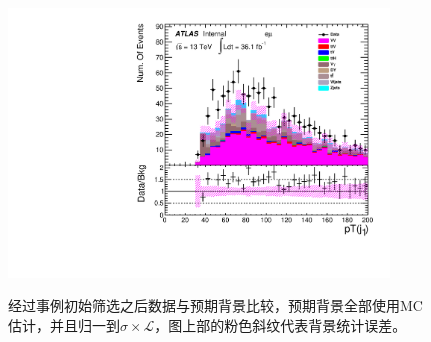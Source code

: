 \begin{figure}[h]
\begin{minipage}[t]{0.33\linewidth}
 \label{fig:nominal:pt_j1_mumu.pdf}
 \end{minipage}
\begin{minipage}[t]{0.33\linewidth}
 \centering
 \includegraphics[width=0.9\textwidth,angle=-90]{fig/nominal/pt_j1_emu.pdf}
 \label{fig:nominal:pt_j1_emu.pdf}
 \end{minipage}
 
 \caption{经过事例初始筛选之后数据与预期背景比较，预期背景全部使用MC估计，并且归一到$\sigma\times\mathcal{L}$，图上部的粉色斜纹代表背景统计误差。}
\label{fig:nominal:datavspureMC}
\end{figure}
\clearpage


